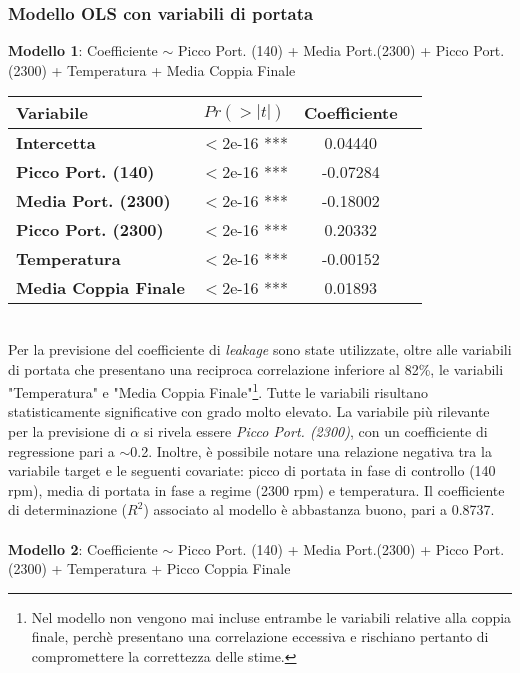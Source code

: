 \documentclass[fleqn,10pt]{SelfArx} %
\begin{document}
\subsubsection{Modello OLS con variabili di portata}
\textbf{Modello 1}: Coefficiente $\sim$  Picco Port. (140) + Media Port.(2300) + Picco Port. (2300) + Temperatura + Media Coppia Finale
{\begin{table}[h] 
\centering
\begin{tabular}[t]{lccc}
\toprule 
Variabile&$Pr(> |t|)$&Coefficiente\\
\midrule 
\textbf{Intercetta}&$<$2e-16 ***&0.04440\\ 
\textbf{Picco Port. (140)}&$<$2e-16 ***&-0.07284\\ 
\textbf{Media Port. (2300)}&$<$2e-16 ***&-0.18002\\ 
\textbf{Picco Port. (2300)}&$<$2e-16 ***&0.20332\\ 
\textbf{Temperatura}&$<$2e-16 ***&-0.00152\\
\textbf{Media Coppia Finale}&$<$2e-16 ***&0.01893\\
\bottomrule 
\end{tabular}
\end{table}}\\
Per la previsione del coefficiente di \textit{leakage} sono state utilizzate, oltre alle variabili di portata che presentano una reciproca correlazione inferiore al 82\%, le variabili "Temperatura" e "Media Coppia Finale"\footnote{\label{cf1}Nel modello non vengono mai incluse entrambe le variabili relative alla coppia finale, perchè presentano una correlazione eccessiva e rischiano pertanto di compromettere la correttezza delle stime.}. Tutte le variabili risultano statisticamente significative con grado molto elevato. La variabile più rilevante per la previsione di $\alpha$ si rivela essere \textit{Picco Port. (2300)}, con un coefficiente di regressione pari a $\sim$0.2. Inoltre, è possibile notare una relazione negativa tra la variabile target e le seguenti covariate: picco di portata in fase di controllo (140 rpm), media di portata in fase a regime (2300 rpm) e temperatura. Il coefficiente di determinazione ($R^2$) associato al modello è abbastanza buono, pari a 0.8737.\\
\\
\textbf{Modello 2}: Coefficiente $\sim$  Picco Port. (140) + Media Port.(2300) + Picco Port. (2300) + Temperatura + Picco Coppia Finale
\end{document}
